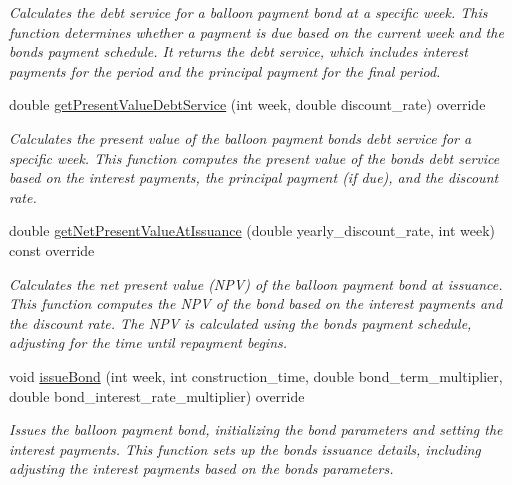 \begin{DoxyCompactItemize}
\begin{DoxyCompactList}\small\item\em Calculates the debt service for a balloon payment bond at a specific week. This function determines whether a payment is due based on the current week and the bond\textquotesingle{}s payment schedule. It returns the debt service, which includes interest payments for the period and the principal payment for the final period. \end{DoxyCompactList}\item 
double \mbox{\hyperlink{classBalloonPaymentBond_ae038863f7a3408c2c8cd503d8e789f2d}{get\+Present\+Value\+Debt\+Service}} (int week, double discount\+\_\+rate) override
\begin{DoxyCompactList}\small\item\em Calculates the present value of the balloon payment bond\textquotesingle{}s debt service for a specific week. This function computes the present value of the bond\textquotesingle{}s debt service based on the interest payments, the principal payment (if due), and the discount rate. \end{DoxyCompactList}\item 
double \mbox{\hyperlink{classBalloonPaymentBond_abbfaae70e003f057ec842d3889138345}{get\+Net\+Present\+Value\+At\+Issuance}} (double yearly\+\_\+discount\+\_\+rate, int week) const override
\begin{DoxyCompactList}\small\item\em Calculates the net present value (N\+PV) of the balloon payment bond at issuance. This function computes the N\+PV of the bond based on the interest payments and the discount rate. The N\+PV is calculated using the bond\textquotesingle{}s payment schedule, adjusting for the time until repayment begins. \end{DoxyCompactList}\item 
void \mbox{\hyperlink{classBalloonPaymentBond_af22552acd74b08dbb1d308cc5e45344c}{issue\+Bond}} (int week, int construction\+\_\+time, double bond\+\_\+term\+\_\+multiplier, double bond\+\_\+interest\+\_\+rate\+\_\+multiplier) override
\begin{DoxyCompactList}\small\item\em Issues the balloon payment bond, initializing the bond parameters and setting the interest payments. This function sets up the bond\textquotesingle{}s issuance details, including adjusting the interest payments based on the bond\textquotesingle{}s parameters. \end{DoxyCompactList}\end{DoxyCompactItemize}
